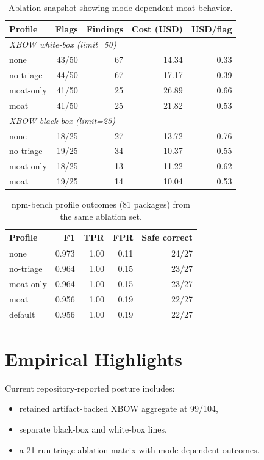 \documentclass[11pt]{article}
\begin{document}
\begin{table}[ht]
\centering
\small
\begin{tabular}{lrrrr}
\toprule
Profile & Flags & Findings & Cost (USD) & USD/flag \\
\midrule
\multicolumn{5}{l}{\textit{XBOW white-box (limit=50)}} \\
none & 43/50 & 67 & 14.34 & 0.33 \\
no-triage & 44/50 & 67 & 17.17 & 0.39 \\
moat-only & 41/50 & 25 & 26.89 & 0.66 \\
moat & 41/50 & 25 & 21.82 & 0.53 \\
\midrule
\multicolumn{5}{l}{\textit{XBOW black-box (limit=25)}} \\
none & 18/25 & 27 & 13.72 & 0.76 \\
no-triage & 19/25 & 34 & 10.37 & 0.55 \\
moat-only & 18/25 & 13 & 11.22 & 0.62 \\
moat & 19/25 & 14 & 10.04 & 0.53 \\
\bottomrule
\end{tabular}
\caption{Ablation snapshot showing mode-dependent moat behavior.}
\label{tab:ablation-xbow}
\end{table}

\begin{table}[ht]
\centering
\small
\begin{tabular}{lrrrr}
\toprule
Profile & F1 & TPR & FPR & Safe correct \\
\midrule
none & 0.973 & 1.00 & 0.11 & 24/27 \\
no-triage & 0.964 & 1.00 & 0.15 & 23/27 \\
moat-only & 0.964 & 1.00 & 0.15 & 23/27 \\
moat & 0.956 & 1.00 & 0.19 & 22/27 \\
default & 0.956 & 1.00 & 0.19 & 22/27 \\
\bottomrule
\end{tabular}
\caption{npm-bench profile outcomes (81 packages) from the same ablation set.}
\label{tab:ablation-npm}
\end{table}

\section{Empirical Highlights}

Current repository-reported posture includes:
\begin{itemize}
  \item retained artifact-backed XBOW aggregate at 99/104,
  \item separate black-box and white-box lines,
  \item a 21-run triage ablation matrix with mode-dependent outcomes.
\end{itemize}
\end{document}
